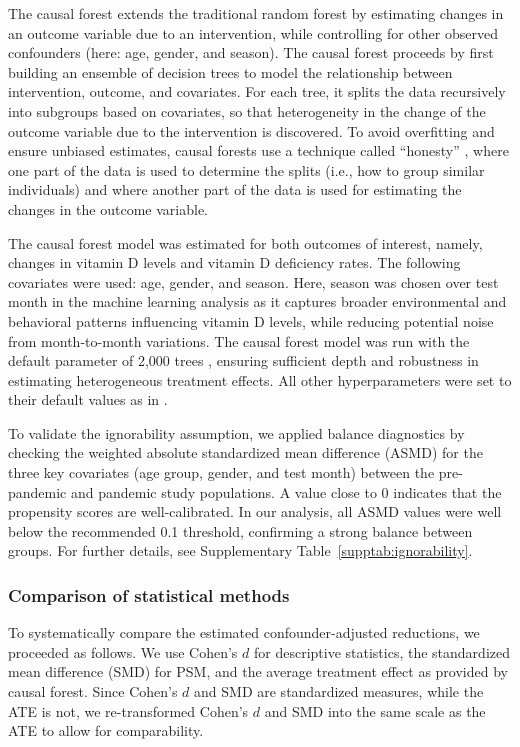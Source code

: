 \documentclass[12pt]{article}
\begin{document}
The causal forest extends the traditional random forest \cite{Breiman2001} by estimating changes in an outcome variable due to an intervention, while controlling for other observed confounders (here: age, gender, and season). The causal forest proceeds by first building an ensemble of decision trees to model the relationship between intervention, outcome, and covariates. For each tree, it splits the data recursively into subgroups based on covariates, so that heterogeneity in the change of the outcome variable due to the intervention is discovered. To avoid overfitting and ensure unbiased estimates, causal forests use a technique called ``honesty'' \cite{Wager2018}, where one part of the data is used to determine the splits (i.e., how to group similar individuals) and where another part of the data is used for estimating the changes in the outcome variable. 

The causal forest model was estimated for both outcomes of interest, namely, changes in vitamin D levels and vitamin D deficiency rates. The following covariates were used: age, gender, and season. Here, season was chosen over test month in the machine learning analysis as it captures broader environmental and behavioral patterns influencing vitamin D levels, while reducing potential noise from month-to-month variations. The causal forest model was run with the default parameter of 2,000 trees \cite{grfpackage}, ensuring sufficient depth and robustness in estimating heterogeneous treatment effects. All other hyperparameters were set to their default values as in \cite{grfpackage}.

To validate the ignorability assumption, we applied balance diagnostics by checking the weighted absolute standardized mean difference (ASMD) for the three key covariates (age group, gender, and test month) between the pre-pandemic and pandemic study populations. A value close to 0 indicates that the propensity scores are well-calibrated. In our analysis, all ASMD values were well below the recommended 0.1 threshold, confirming a strong balance between groups. For further details, see Supplementary Table~\ref{supptab:ignorability}.

\subsubsection*{Comparison of statistical methods}

To systematically compare the estimated confounder-adjusted reductions, we proceeded as follows. We use  Cohen's $d$ \cite{Cohen1988} for descriptive statistics, the standardized mean difference (SMD) \cite{Higgins2011} for PSM, and the average treatment effect as provided by causal forest. Since Cohen's $d$ and SMD are standardized measures, while the ATE is not, we re-transformed Cohen's $d$ and SMD into the same scale as the ATE to allow for comparability. 
\end{document}
